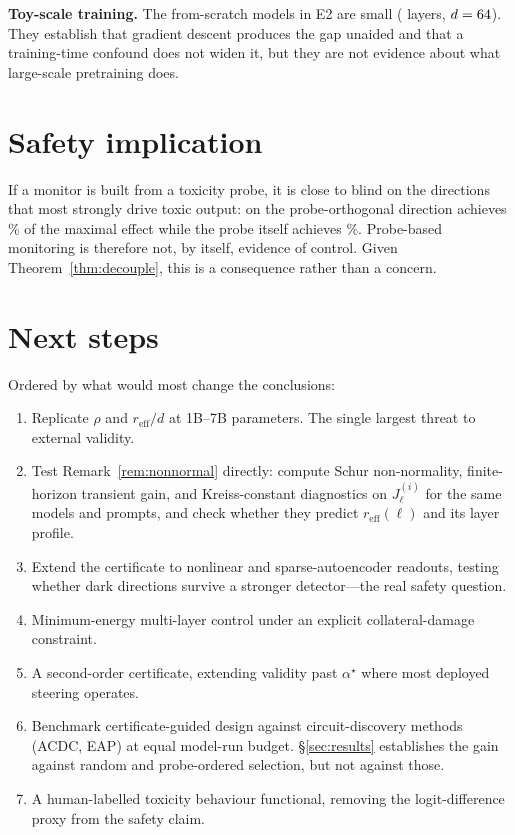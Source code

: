 \documentclass[11pt]{article}
\theoremstyle{definition}
\theoremstyle{remark}
\newcommand{\reff}{r_{\mathrm{eff}}}
\begin{document}
\textbf{Toy-scale training.} The from-scratch models in E2 are small
(\EtwoLayers{} layers, $d=64$). They establish that gradient descent
produces the gap unaided and that a training-time confound does not widen it,
but they are not evidence about what large-scale pretraining does.

\section{Safety implication}

If a monitor is built from a toxicity probe, it is close to blind on the
directions that most strongly drive toxic output: on \EthreeModel{} the
probe-orthogonal direction achieves \EthreeEffDark\% of the maximal effect while
the probe itself achieves \EthreeEffProbe\%. Probe-based monitoring is therefore
not, by itself, evidence of control. Given Theorem~\ref{thm:decouple}, this is a
consequence rather than a concern.

\section{Next steps}
\label{sec:next}

Ordered by what would most change the conclusions:
\begin{enumerate}[leftmargin=1.5em,itemsep=1pt]
  \item Replicate $\rho$ and $\reff/d$ at 1B--7B parameters. The single largest
  threat to external validity.
  \item Test Remark~\ref{rem:nonnormal} directly: compute Schur non-normality,
  finite-horizon transient gain, and Kreiss-constant diagnostics on $J_\ell^{(i)}$
  for the same models and prompts, and check whether they predict $\reff(\ell)$
  and its layer profile.
  \item Extend the certificate to nonlinear and sparse-autoencoder readouts,
  testing whether dark directions survive a stronger detector---the real safety
  question.
  \item Minimum-energy multi-layer control under an explicit collateral-damage
  constraint.
  \item A second-order certificate, extending validity past $\alpha^\star$ where
  most deployed steering operates.
  \item Benchmark certificate-guided design against circuit-discovery methods
  (ACDC, EAP) at equal model-run budget. \S\ref{sec:results} establishes the
  gain against random and probe-ordered selection, but not against those.
  \item A human-labelled toxicity behaviour functional, removing the
  logit-difference proxy from the safety claim.
\end{enumerate}
\end{document}
